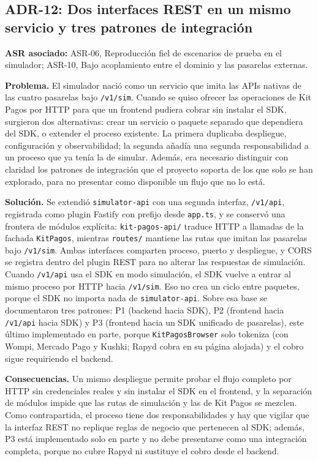 \subsection{ADR-12: Dos interfaces REST en un mismo servicio y tres patrones de integración}
\textbf{ASR asociado:} ASR-06, Reproducción fiel de escenarios de prueba en el simulador; ASR-10, Bajo acoplamiento entre el dominio y las pasarelas externas.

\textbf{Problema.} El simulador nació como un servicio que imita las APIs nativas de las cuatro pasarelas bajo \texttt{/v1/sim}. Cuando se quiso ofrecer las operaciones de Kit Pagos por HTTP para que un frontend pudiera cobrar sin instalar el SDK, surgieron dos alternativas: crear un servicio o paquete separado que dependiera del SDK, o extender el proceso existente. La primera duplicaba despliegue, configuración y observabilidad; la segunda añadía una segunda responsabilidad a un proceso que ya tenía la de simular. Además, era necesario distinguir con claridad los patrones de integración que el proyecto soporta de los que solo se han explorado, para no presentar como disponible un flujo que no lo está.

\textbf{Solución.} Se extendió \texttt{simulator-api} con una segunda interfaz, \texttt{/v1/api}, registrada como plugin Fastify con prefijo desde \texttt{app.ts}, y se conservó una frontera de módulos explícita: \texttt{kit-pagos-api/} traduce HTTP a llamadas de la fachada \texttt{KitPagos}, mientras \texttt{routes/} mantiene las rutas que imitan las pasarelas bajo \texttt{/v1/sim}. Ambas interfaces comparten proceso, puerto y despliegue, y CORS se registra dentro del plugin REST para no alterar las respuestas de simulación. Cuando \texttt{/v1/api} usa el SDK en modo simulación, el SDK vuelve a entrar al mismo proceso por HTTP hacia \texttt{/v1/sim}. Eso no crea un ciclo entre paquetes, porque el SDK no importa nada de \texttt{simulator-api}. Sobre esa base se documentaron tres patrones: P1 (backend hacia SDK), P2 (frontend hacia \texttt{/v1/api} hacia SDK) y P3 (frontend hacia un SDK unificado de pasarelas), este último implementado en parte, porque \texttt{KitPagosBrowser} solo tokeniza (con Wompi, Mercado Pago y Kushki; Rapyd cobra en su página alojada) y el cobro sigue requiriendo el backend.

\textbf{Consecuencias.} Un mismo despliegue permite probar el flujo completo por HTTP sin credenciales reales y sin instalar el SDK en el frontend, y la separación de módulos impide que las rutas de simulación y las de Kit Pagos se mezclen. Como contrapartida, el proceso tiene dos responsabilidades y hay que vigilar que la interfaz REST no replique reglas de negocio que pertenecen al SDK; además, P3 está implementado solo en parte y no debe presentarse como una integración completa, porque no cubre Rapyd ni sustituye el cobro desde el backend.
